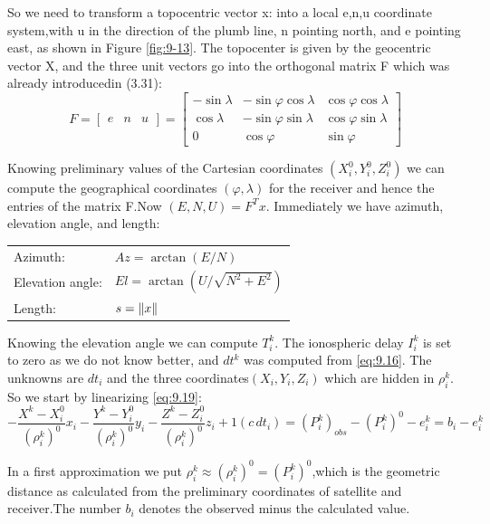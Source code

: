 	So we need to transform a topocentric vector x: into a local e,n,u coordinate system,with u in the direction of the plumb line, n pointing north, and e pointing east, as shown in Figure \ref{fig:9-13}. The topocenter is given by the geocentric vector X, and the three unit vectors go into the orthogonal matrix F which was already introducedin (3.31):
	\begin{equation}\label{eq:9.20}
		F = \begin{bmatrix}
		e & n & u
		\end{bmatrix}=
		\begin{bmatrix}
		-\sin \lambda & -\sin\varphi\cos\lambda & \cos\varphi\cos\lambda \\
		 \cos \lambda & -\sin\varphi\sin\lambda & \cos\varphi\sin\lambda \\
		 0 & \cos\varphi & \sin\varphi
		\end{bmatrix}
	\end{equation}
	
	Knowing preliminary values of the Cartesian coordinates $(X^0_i,Y^0_i,Z^0_i)$ we can compute the geographical coordinates $(\varphi,\lambda)$ for the receiver and hence the entries of the matrix F.Now $(E,N,U)=F^Tx$. Immediately we have azimuth, elevation angle, and length:
	\begin{table}
		\begin{tabular}{ll}
			Azimuth: 		 & $Az = \arctan(E/N)$ \\ 
			Elevation angle: & $El=\arctan(U/\sqrt{N^2+E^2})$ \\ 
			Length:			 & $s=\Arrowvert x \Arrowvert$ \\ 
		\end{tabular} 
	\end{table}
	
	Knowing the elevation angle we can compute $T^k_i$. The ionospheric delay $I^k_i$ is set to zero as we do not know better, and $dt^k$ was computed from \ref{eq:9.16}. The unknowns are $dt_i$ and the three coordinates$(X_i,Y_i,Z_i)$ which are hidden in $\rho^k_i$. So we start by linearizing \ref{eq:9.19}:
	\begin{equation}\label{eq:9.21}
		-\dfrac{X^k-X^0_i}{(\rho^k_i)^0}x_i-\dfrac{Y^k-Y^0_i}{(\rho^k_i)^0}y_i-\dfrac{Z^k-Z^0_i}{(\rho^k_i)^0}z_i+1(c\,dt_i)=(P^k_i)_{obs}-(P^k_i)^0-e^k_i=b_i-e^k_i
	\end{equation}
		
	In a first approximation we put $\rho^k_i\approx(\rho^k_i)^0=(P^k_i)^0$,which is the geometric distance as calculated from the preliminary coordinates of satellite and receiver.The number $b_i$ denotes the observed minus the calculated value.
	
